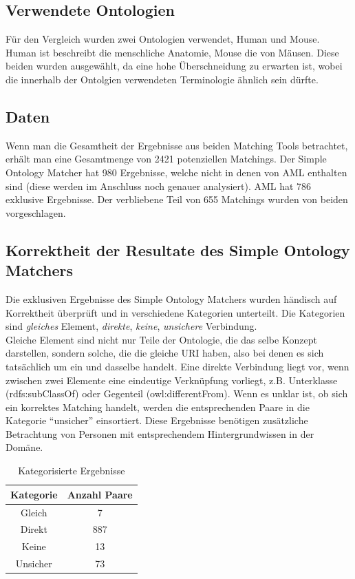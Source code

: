 		\subsection{Verwendete Ontologien}
		Für den Vergleich wurden zwei Ontologien verwendet, Human und Mouse. Human
		ist beschreibt die menschliche Anatomie, Mouse die von Mäusen. Diese beiden
		wurden ausgewählt, da eine hohe Überschneidung zu erwarten ist, wobei die
		innerhalb der Ontolgien verwendeten Terminologie ähnlich sein dürfte.
		
		\subsection{Daten}
		Wenn man die Gesamtheit der Ergebnisse aus beiden Matching Tools betrachtet,
		erhält man eine Gesamtmenge von 2421 potenziellen Matchings. Der Simple
		Ontology Matcher hat 980 Ergebnisse, welche nicht in denen von AML enthalten
		sind (diese werden im Anschluss noch genauer analysiert). AML hat 786
		exklusive Ergebnisse. Der verbliebene Teil von 655 Matchings wurden von beiden
		vorgeschlagen.
		
		\subsection{Korrektheit der Resultate des Simple Ontology Matchers}
		Die exklusiven Ergebnisse des Simple Ontology Matchers wurden händisch auf
		Korrektheit überprüft und in verschiedene Kategorien unterteilt. Die
		Kategorien sind \textit{gleiches} Element, \textit{direkte}, \textit{keine}, \textit{unsichere}
		Verbindung.\\
		Gleiche Element sind nicht nur Teile der Ontologie, die das
		selbe Konzept darstellen, sondern solche, die die gleiche URI haben, also bei denen
		es sich tatsächlich um ein und dasselbe handelt. Eine direkte Verbindung liegt
		vor, wenn zwischen zwei Elemente eine eindeutige Verknüpfung vorliegt, z.B.
		Unterklasse (rdfs:subClassOf) oder Gegenteil (owl:differentFrom). Wenn
		es unklar ist, ob sich ein korrektes Matching handelt, werden die entsprechenden Paare in die
		Kategorie "`unsicher"' einsortiert. Diese Ergebnisse benötigen zusätzliche
		Betrachtung von Personen mit entsprechendem Hintergrundwissen in der Domäne.\\
		
		\begin{table}
		\centering
		\caption{Kategorisierte Ergebnisse}
		\begin{tabular}{|c|c|}\hline
		Kategorie & Anzahl Paare\\ \hline
		Gleich & 7\\ \hline
		Direkt & 887\\ \hline
		Keine & 13\\ \hline
		Unsicher & 73\\ \hline
		\end{tabular}
		\end{table}
		
